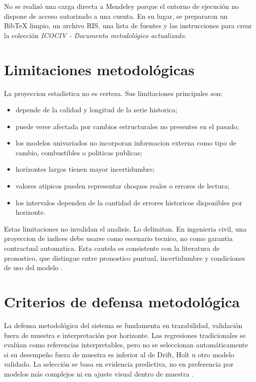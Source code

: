 ﻿\documentclass[12pt,letterpaper]{article}
\begin{document}
No se realizó una carga directa a Mendeley porque el entorno de ejecución no dispone de acceso autorizado a una cuenta. En su lugar, se prepararon un BibTeX limpio, un archivo RIS, una lista de fuentes y las instrucciones para crear la colección \textit{ICOCIV - Documento metodológico actualizado}.

\section{Limitaciones metodológicas}

La proyeccion estadistica no es certeza. Sus limitaciones principales son:

\begin{itemize}[leftmargin=*]
    \item depende de la calidad y longitud de la serie historica;
    \item puede verse afectada por cambios estructurales no presentes en el pasado;
    \item los modelos univariados no incorporan informacion externa como tipo de cambio, combustibles o politicas publicas;
    \item horizontes largos tienen mayor incertidumbre;
    \item valores atipicos pueden representar choques reales o errores de lectura;
    \item los intervalos dependen de la cantidad de errores historicos disponibles por horizonte.
\end{itemize}

Estas limitaciones no invalidan el analisis. Lo delimitan. En ingenieria civil, una proyeccion de indices debe usarse como escenario tecnico, no como garantia contractual automatica. Esta cautela es consistente con la literatura de pronostico, que distingue entre pronostico puntual, incertidumbre y condiciones de uso del modelo \citep{hyndman2021fpp3}.

\section{Criterios de defensa metodológica}

La defensa metodológica del sistema se fundamenta en trazabilidad, validación fuera de muestra e interpretación por horizonte. Las regresiones tradicionales se evalúan como referencias interpretables, pero no se seleccionan automáticamente si su desempeño fuera de muestra es inferior al de Drift, Holt u otro modelo validado. La selección se basa en evidencia predictiva, no en preferencia por modelos más complejos ni en ajuste visual dentro de muestra \citep{tashman2000,hyndman_koehler2006}.
\end{document}
